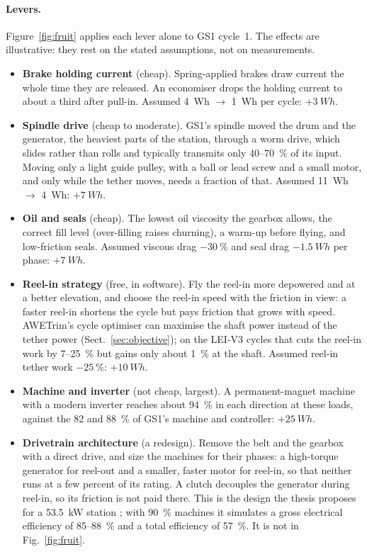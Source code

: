 \documentclass[11pt,a4paper]{article}
\begin{document}
\paragraph{Levers.} Figure~\ref{fig:fruit} applies each lever alone to GS1
cycle~1. The effects are illustrative: they rest on the stated assumptions,
not on measurements.
\begin{itemize}
  \item \textbf{Brake holding current} (cheap). Spring-applied brakes draw
    current the whole time they are released. An economiser drops the holding
    current to about a third after pull-in. Assumed \SI{4}{Wh} $\to$
    \SI{1}{Wh} per cycle: $+\SI{3}{Wh}$.
  \item \textbf{Spindle drive} (cheap to moderate). GS1's spindle moved the
    drum and the generator, the heaviest parts of the station, through a worm
    drive, which slides rather than rolls and typically transmits only
    40--\SI{70}{\percent} of its input. Moving only a light guide pulley, with
    a ball or lead screw and a small motor, and only while the tether moves,
    needs a fraction of that. Assumed \SI{11}{Wh} $\to$ \SI{4}{Wh}:
    $+\SI{7}{Wh}$.
  \item \textbf{Oil and seals} (cheap). The lowest oil viscosity the gearbox
    allows, the correct fill level (over-filling raises churning), a warm-up
    before flying, and low-friction seals. Assumed viscous drag
    $-\SI{30}{\percent}$ and seal drag $-\SI{1.5}{Wh}$ per phase:
    $+\SI{7}{Wh}$.
  \item \textbf{Reel-in strategy} (free, in software). Fly the reel-in more
    depowered and at a better elevation, and choose the reel-in speed with
    the friction in view: a faster reel-in shortens the cycle but pays
    friction that grows with speed. AWETrim's cycle optimiser can maximise the
    shaft power instead of the tether power (Sect.~\ref{sec:objective}); on
    the LEI-V3 cycles that cuts the reel-in work by 7--\SI{25}{\percent} but
    gains only about \SI{1}{\percent} at the shaft. Assumed reel-in tether
    work $-\SI{25}{\percent}$: $+\SI{10}{Wh}$.
  \item \textbf{Machine and inverter} (not cheap, largest). A
    permanent-magnet machine with a modern inverter reaches about
    \SI{94}{\percent} in each direction at these loads, against the 82 and
    \SI{88}{\percent} of GS1's machine and controller: $+\SI{25}{Wh}$.
  \item \textbf{Drivetrain architecture} (a redesign). Remove the belt and the
    gearbox with a direct drive, and size the machines for their phases: a
    high-torque generator for reel-out and a smaller, faster motor for
    reel-in, so that neither runs at a few percent of its rating. A clutch
    decouples the generator during reel-in, so its friction is not paid
    there. This is the design the thesis proposes for a \SI{53.5}{kW} station
    \cite[Sect.~3.4]{fechner2016}; with \SI{90}{\percent} machines it
    simulates a gross electrical efficiency of 85--\SI{88}{\percent} and a
    total efficiency of \SI{57}{\percent}. It is not in Fig.~\ref{fig:fruit}.
\end{itemize}
\end{document}
